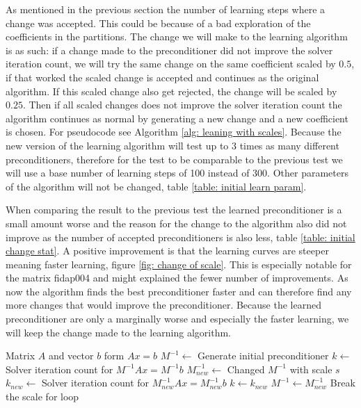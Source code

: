As mentioned in the previous section the number of learning steps where a change was accepted. This could be because of a bad exploration of the coefficients in the partitions. The change we will make to the learning algorithm is as such: if a change made to the preconditioner did not improve the solver iteration count, we will try the same change on the same coefficient scaled by \(0.5\), if that worked the scaled change is accepted and continues as the original algorithm. If this scaled change also get rejected, the change will be scaled by \(0.25\). Then if all scaled changes does not improve the solver iteration count the algorithm continues as normal by generating a new change and a new coefficient is chosen. For pseudocode see Algorithm \ref{alg: leaning with scales}. Because the new version of the learning algorithm will test up to 3 times as many different preconditioners, therefore for the test to be comparable to the previous test we will use a base number of learning steps of 100 instead of 300. Other parameters of the algorithm will not be changed, table \ref{table: initial learn param}.

When comparing the result to the previous test the learned preconditioner is a small amount worse and the reason for the change to the algorithm also did not improve as the number of accepted preconditioners is also less, table \ref{table: initial change stat}. A positive improvement is that the learning curves are steeper meaning faster learning, figure \ref{fig: change of scale}. This is especially notable for the matrix fidap004 and might explained the fewer number of improvements. As now the algorithm finds the best preconditioner faster and can therefore find any more changes that would improve the preconditioner. Because the learned preconditioner are only a marginally worse and especially the faster learning, we will keep the change made to the learning algorithm.

\begin{algorithm}[H]
    \caption{Preconditioner learning algorithm with scaling of the change}\label{alg: leaning with scales}
    \begin{algorithmic}
        \Require Matrix \(A\) and vector \(b\) form \(Ax=b\)
        \State \(M^{-1} \gets \) Generate initial preconditioner
        \State \(k \gets\) Solver iteration count for \(M^{-1}Ax=M^{-1}b\)
                \State \(M^{-1}_{new} \gets \) Changed \(M^{-1}\) with scale \(s\)
                \State \(k_{new} \gets\) Solver iteration count for \(M^{-1}_{new}Ax=M^{-1}_{new}b\)
                    \State \(k \gets k_{new}\)
                    \State \(M^{-1} \gets M^{-1}_{new}\)
                    \State Break the scale for loop
                \EndIf
            \EndLoop
        \EndLoop
    \end{algorithmic}
\end{algorithm}

